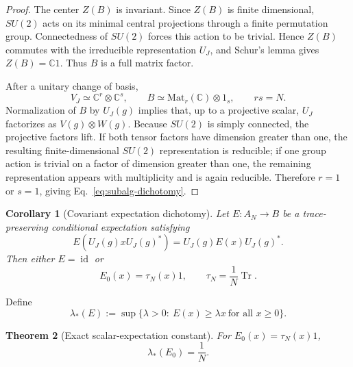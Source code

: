 \documentclass[aps,prd,preprint,nofootinbib,superscriptaddress]{revtex4-2}
\newtheorem{theorem}{Theorem}[section]
\newtheorem{corollary}[theorem]{Corollary}
\theoremstyle{definition}
\theoremstyle{remark}
\newcommand{\Tr}{\operatorname{Tr}}
\newcommand{\id}{\operatorname{id}}
\newcommand{\PP}{\lambda_*}
\begin{document}
\begin{proof}
The center $Z(B)$ is invariant.  Since $Z(B)$ is finite dimensional, $SU(2)$ acts on its minimal central projections through a finite permutation group.  Connectedness of $SU(2)$ forces this action to be trivial.  Hence $Z(B)$ commutes with the irreducible representation $U_J$, and Schur's lemma gives $Z(B)=\mathbb C1$.  Thus $B$ is a full matrix factor.

After a unitary change of basis,
\begin{equation}
V_J\simeq\mathbb C^r\otimes\mathbb C^s,
\qquad
B\simeq \mathrm{Mat}_r(\mathbb C)\otimes1_s,
\qquad
rs=N.
\end{equation}
Normalization of $B$ by $U_J(g)$ implies that, up to a projective scalar, $U_J$ factorizes as $V(g)\otimes W(g)$.  Because $SU(2)$ is simply connected, the projective factors lift.  If both tensor factors have dimension greater than one, the resulting finite-dimensional $SU(2)$ representation is reducible; if one group action is trivial on a factor of dimension greater than one, the remaining representation appears with multiplicity and is again reducible.  Therefore $r=1$ or $s=1$, giving Eq.~\eqref{eq:subalg-dichotomy}.
\end{proof}

\begin{corollary}[Covariant expectation dichotomy]
\label{cor:expectation-dichotomy}
Let $E:A_N\to B$ be a trace-preserving conditional expectation satisfying
\begin{equation}
E\!\left(U_J(g)xU_J(g)^*\right)
=
U_J(g)E(x)U_J(g)^*.
\end{equation}
Then either $E=\id$ or
\begin{equation}
E_0(x)=\tau_N(x)1,
\qquad
\tau_N=\frac1N\Tr.
\end{equation}
\end{corollary}

Define
\begin{equation}
\PP(E):=
\sup\{\lambda>0:\ E(x)\ge\lambda x\ \text{for all }x\ge0\}.
\label{eq:ppdef-matrix}
\end{equation}

\begin{theorem}[Exact scalar-expectation constant]
\label{thm:scalarpp}
For $E_0(x)=\tau_N(x)1$,
\begin{equation}
\PP(E_0)=\frac1N.
\label{eq:scalarpp}
\end{equation}
\end{theorem}
\end{document}
